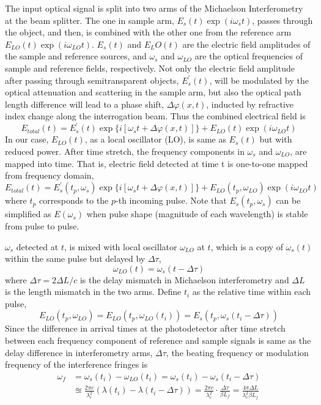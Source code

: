 \documentclass[aps,pra,preprint,superscriptaddress]{revtex4-1}
\begin{document}
The input optical signal is split into two arms of the Michaelson Interferometry at the beam splitter. The one in sample arm, $E_s(t)\exp⁡(i\omega_s t)$, passes through the object, and then, is combined with the other one from the reference arm $E_{LO}(t)\exp⁡(i\omega_{LO} t)$. $E_s(t)$ and $E_LO(t)$ are the electric field amplitudes of the sample and reference sources, and $\omega_s$ and $\omega_{LO}$ are the optical frequencies of sample and reference fields, respectively. Not only the electric field amplitude after passing through semitransparent objects, $E_s^\prime(t)$, will be modulated by the optical attenuation and scattering in the sample arm, but also the optical path length difference will lead to a phase shift, $\Delta\varphi(x,t)$, inducted by refractive index change along the interrogation beam. Thus the combined electrical field is
\begin{equation}
E_{total}(t) = E_s^\prime(t) \exp⁡ \lbrace i[\omega_s t+\Delta\varphi(x,t)] \rbrace + E_{LO}(t) \exp⁡(i\omega_{LO} t)
\end{equation}
In our case, $E_{LO}(t)$, as a local oscillator (LO), is same as $E_s(t)$ but with reduced power. After time stretch, the frequency components in $\omega_s$ and $\omega_{LO}$, are mapped into time. That is, electric field detected at time t is one-to-one mapped from frequency domain,
\begin{equation}
E_{total}(t) = E_s^\prime(t_p,\omega_s) \exp ⁡\lbrace i[\omega_s t+\Delta\varphi(x,t)] \rbrace + E_{LO}(t_p,\omega_{LO}) \exp⁡(i\omega_{LO} t)
\end{equation}
where $t_p$ corresponds to the $p$-th incoming pulse. Note that $E_s(t_p,\omega_s)$ can be simplified as $E(\omega_s)$ when pulse shape (magnitude of each wavelength) is stable from pulse to pulse.

$\omega_s$ detected at $t$, is mixed with local oscillator $\omega_{LO}$ at $t$, which is a copy of $\omega_s(t)$ within the same pulse but delayed by $\Delta\tau$,
\begin{equation}
\omega_{LO}(t) = \omega_s(t-\Delta\tau)
\end{equation}
where $\Delta\tau = 2 \Delta L/c$ is the delay mismatch in Michaelson interferometry and $\Delta L$ is the length mismatch in the two arms. Define $t_i$ as the relative time within each pulse,
\begin{equation}
E_{LO}(t_p,\omega_{LO}) = E_{LO}(t_p,\omega_{LO}(t_i)) = E_s(t_p,\omega_s(t_i-\Delta\tau))
\end{equation}
Since the difference in arrival times at the photodetector after time stretch between each frequency component of reference and sample signals is same as the delay difference in interferometry arms, $\Delta\tau$, the beating frequency or modulation frequency of the interference fringes is
\begin{align*}
\omega_f& = \omega_s(t_i ) - \omega_{LO}(t_i ) = \omega_s(t_i ) - \omega_s(t_i-\Delta\tau)\\& \approxeq \frac{2\pi c}{\lambda_c^2} (\lambda(t_i) - \lambda(t_i-\Delta\tau)) = \frac{2\pi c}{\lambda_c^2} \cdot \frac{\Delta\tau}{\beta L_f} = \frac{4\pi\Delta L}{\lambda_c^2 \beta L_f}
\end{align*}
\end{document}
